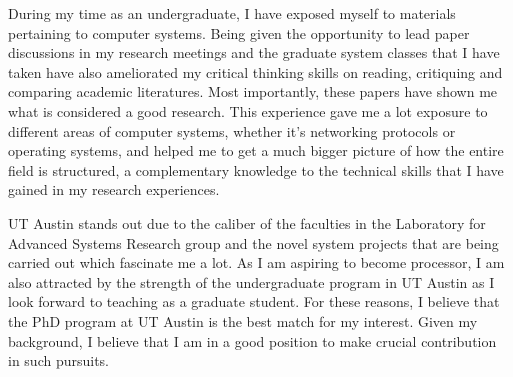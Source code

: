 \documentclass[12pt]{article}
\begin{document}
%

During my time as an undergraduate, I have exposed myself to materials pertaining to computer systems. Being given the opportunity to lead paper discussions in my research meetings and the graduate system classes that I have taken have also ameliorated my critical thinking skills on reading, critiquing and comparing academic literatures. Most importantly, these papers have shown me what is considered a good research. This experience gave me a lot exposure to different areas of computer systems, whether it's networking protocols or operating systems, and helped me to get a much bigger picture of how the entire field is structured, a complementary knowledge to the technical skills that I have gained in my research experiences. \newline

UT Austin stands out due to the caliber of the faculties in the Laboratory for Advanced Systems Research group and the novel system projects that are being carried out which fascinate me a lot. As I am aspiring to become processor, I am also attracted by the strength of the undergraduate program in UT Austin as I look forward to teaching as a graduate student. For these reasons, I believe that the PhD program at UT Austin is the best match for my interest. Given my background, I believe that I am in a good position to make crucial contribution in such pursuits. \newline



\end{document}
